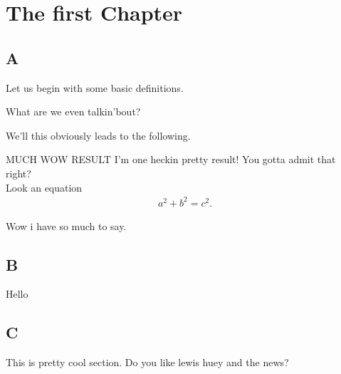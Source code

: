\chapter{The first Chapter}\label{ch:One}
\section{A}
Let us begin with some basic definitions.
\begin{definition}{}{}
What are we even talkin'bout?
\end{definition}
We'll this obviously leads to the following.
\begin{theorem}{MUCH WOW RESULT}{}
I'm one heckin pretty result! You gotta admit that right?\\
Look an equation
\begin{align*}
a^2+b^2=c^2.
\end{align*}
\end{theorem}

Wow i have so much to say.\newpage

\section{B}
Hello
\section{C}
This is pretty cool section.\newpage
Do you like lewis huey and the news?